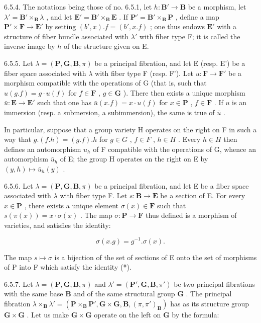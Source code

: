 6.5.4. The notations being those of no. 6.5.1, let \(h: \mathbf{B}' \to \mathbf{B}\) be a morphism, let \(\lambda' = \mathbf{B}' \times_{\mathbf{B}} \lambda\) , and let \(\mathbf{E}' = \mathbf{B}' \times_{\mathbf{B}} \mathbf{E}\) . If \(\mathbf{P}' = \mathbf{B}' \times_{\mathbf{B}} \mathbf{P}\) , define a map \(\mathbf{P}' \times \mathbf{F} \to \mathbf{E}'\) by setting \((b', x).f = (b', x.f)\) ; one thus endows \(\mathbf{E}'\) with a structure of fiber bundle associated with \(\lambda'\) with fiber type F; it is called the inverse image by \(h\) of the structure given on E.

6.5.5. Let \(\lambda = (\mathbf{P}, \mathbf{G}, \mathbf{B}, \pi)\) be a principal fibration, and let E (resp. E') be a fiber space associated with \(\lambda\) with fiber type F (resp. F'). Let \(u: \mathbf{F} \to \mathbf{F}'\) be a morphism compatible with the operations of G (that is, such that \(u(g.f) = g \cdot u(f)\) for \(f \in \mathbf{F}\) , \(g \in \mathbf{G}\) ). There then exists a unique morphism \(\bar{u}: \mathbf{E} \to \mathbf{E}'\) such that one has \(\bar{u}(x.f) = x \cdot u(f)\) for \(x \in \mathbf{P}\) , \(f \in \mathbf{F}\) . If \(u\) is an immersion (resp. a submersion, a subimmersion), the same is true of \(\bar{u}\) .

In particular, suppose that a group variety H operates on the right on F in such a way that \(g.(f.h) = (g.f).h\) for \(g \in G\) , \(f \in F\) , \(h \in H\) . Every \(h \in H\) then defines an automorphism \(u_h\) of F compatible with the operations of G, whence an automorphism \(\bar{u}_h\) of E; the group H operates on the right on E by \((y,h) \mapsto \bar{u}_h(y)\) .

6.5.6. Let \(\lambda = (\mathbf{P},\mathbf{G},\mathbf{B},\pi)\) be a principal fibration, and let E be a fiber space associated with \(\lambda\) with fiber type F. Let \(s: \mathbf{B} \to \mathbf{E}\) be a section of E. For every \(x \in \mathbf{P}\) , there exists a unique element \(\sigma(x) \in \mathbf{F}\) such that \(s(\pi(x)) = x \cdot \sigma(x)\) . The map \(\sigma: \mathbf{P} \to \mathbf{F}\) thus defined is a morphism of varieties, and satisfies the identity:

\[
\sigma (x. g) = g ^ {- 1}. \sigma (x).\tag{*}
\]

The map \(s \mapsto \sigma\) is a bijection of the set of sections of E onto the set of morphisms of P into F which satisfy the identity (*).

6.5.7. Let \(\lambda = (\mathbf{P}, \mathbf{G}, \mathbf{B}, \pi)\) and \(\lambda' = (\mathbf{P}', \mathbf{G}, \mathbf{B}, \pi')\) be two principal fibrations with the same base \(\mathbf{B}\) and of the same structural group \(\mathbf{G}\) . The principal fibration \(\lambda \times_{\mathbf{B}} \lambda' = (\mathbf{P} \times_{\mathbf{B}} \mathbf{P}', \mathbf{G} \times \mathbf{G}, \mathbf{B}, (\pi, \pi')_{\mathbf{B}})\) has as its structure group \(\mathbf{G} \times \mathbf{G}\) . Let us make \(\mathbf{G} \times \mathbf{G}\) operate on the left on \(\mathbf{G}\) by the formula:

